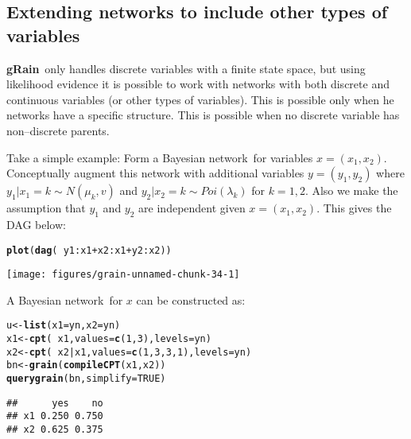 \documentclass[10pt]{article}\usepackage[]{graphicx}\usepackage[]{xcolor}
\makeatletter
\def\maxwidth{ %
  \ifdim\Gin@nat@width>\linewidth
    \linewidth
  \else
    \Gin@nat@width
  \fi
}
\newcommand{\hlnum}[1]{\textcolor[rgb]{0.686,0.059,0.569}{#1}}%
\newcommand{\hlopt}[1]{\textcolor[rgb]{0,0,0}{#1}}%
\newcommand{\hlstd}[1]{\textcolor[rgb]{0.345,0.345,0.345}{#1}}%
\newcommand{\hlkwb}[1]{\textcolor[rgb]{0.69,0.353,0.396}{#1}}%
\newcommand{\hlkwc}[1]{\textcolor[rgb]{0.333,0.667,0.333}{#1}}%
\newcommand{\hlkwd}[1]{\textcolor[rgb]{0.737,0.353,0.396}{\textbf{#1}}}%
\newenvironment{kframe}{%
 \def\at@end@of@kframe{}%
 \ifinner\ifhmode%
  \def\at@end@of@kframe{\end{minipage}}%
  \begin{minipage}{\columnwidth}%
 \fi\fi%
 \def\FrameCommand##1{\hskip\@totalleftmargin \hskip-\fboxsep
 \colorbox{shadecolor}{##1}\hskip-\fboxsep
     \hskip-\linewidth \hskip-\@totalleftmargin \hskip\columnwidth}%
 \MakeFramed {\advance\hsize-\width
   \@totalleftmargin\z@ \linewidth\hsize
   \@setminipage}}%
 {\par\unskip\endMakeFramed%
 \at@end@of@kframe}
\newenvironment{knitrout}{}{} %
\def\grbn{{\bf gRain}}
\def\bn{Bayesian network}
\makeatother
\begin{document}
\subsection{Extending networks to include other types of variables}
\label{sec:ixture}

\grbn\ only handles discrete variables with a finite state space, but
using likelihood evidence it is possible to work with networks with
both discrete and continuous variables (or other types of variables).
This is possible only when he networks have a specific structure. This
is possible when no discrete variable has non--discrete parents.

Take a simple example: Form a \bn\ for variables $x=(x_1, x_2)$. 
Conceptually augment this network with additional variables $y=(y_1, y_2)$ where
$y_1|x_1=k \sim N(\mu_k, v)$ and
$y_2|x_2=k \sim Poi(\lambda_k)$ for $k=1,2$. Also we make the assumption
that $y_1$ and $y_2$ are independent given $x=(x_1, x_2)$. This gives the DAG
below:

\begin{knitrout}
\color{fgcolor}\begin{kframe}
\begin{alltt}
\hlkwd{plot}\hlstd{(}\hlkwd{dag}\hlstd{(}\hlopt{~}\hlstd{y1}\hlopt{:}\hlstd{x1} \hlopt{+} \hlstd{x2}\hlopt{:}\hlstd{x1} \hlopt{+} \hlstd{y2}\hlopt{:}\hlstd{x2))}
\end{alltt}
\end{kframe}
\texttt{[image: figures/grain-unnamed-chunk-34-1]} 
\end{knitrout}


A \bn\ for $x$ can be constructed as:

\begin{knitrout}
\color{fgcolor}\begin{kframe}
\begin{alltt}
\hlstd{u} \hlkwb{<-} \hlkwd{list}\hlstd{(}\hlkwc{x1}\hlstd{=yn,} \hlkwc{x2}\hlstd{=yn)}
\hlstd{x1} \hlkwb{<-} \hlkwd{cpt}\hlstd{(}\hlopt{~}\hlstd{x1,} \hlkwc{values}\hlstd{=}\hlkwd{c}\hlstd{(}\hlnum{1}\hlstd{,} \hlnum{3}\hlstd{),} \hlkwc{levels}\hlstd{=yn)}
\hlstd{x2} \hlkwb{<-} \hlkwd{cpt}\hlstd{(}\hlopt{~}\hlstd{x2}\hlopt{|}\hlstd{x1,} \hlkwc{values}\hlstd{=}\hlkwd{c}\hlstd{(}\hlnum{1}\hlstd{,} \hlnum{3}\hlstd{,} \hlnum{3}\hlstd{,} \hlnum{1}\hlstd{),} \hlkwc{levels}\hlstd{=yn)}
\hlstd{bn} \hlkwb{<-} \hlkwd{grain}\hlstd{(}\hlkwd{compileCPT}\hlstd{(x1, x2))}
\hlkwd{querygrain}\hlstd{(bn,} \hlkwc{simplify}\hlstd{=}\hlnum{TRUE}\hlstd{)}
\end{alltt}
\begin{verbatim}
##      yes    no
## x1 0.250 0.750
## x2 0.625 0.375
\end{verbatim}
\end{kframe}
\end{knitrout}
\end{document}
